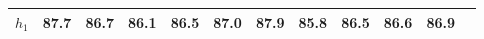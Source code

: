 
        \begin{tabular}{ c|*{11}{c}}
            \hline
            \hline
                \(h_{1}\) &87.7 & 86.7& 86.1 & 86.5 & 87.0& 87.9 & 85.8 & 86.5 & 86.6 & 86.9 \\
            \hline
            \hline
        \end{tabular}
        